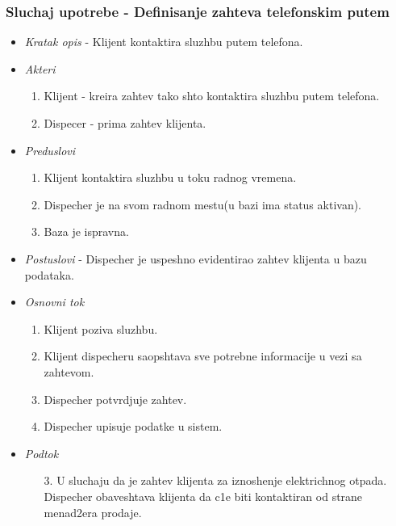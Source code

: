 \documentclass[10 pt]{article}
\begin{document}
	\subsubsection{Sluchaj upotrebe - Definisanje zahteva telefonskim putem}
	
		\begin{itemize}
			
			\item\textit{Kratak opis} - Klijent kontaktira sluzhbu putem telefona.

			
			\item\textit{Akteri} 
				\begin{enumerate}
					\item Klijent - kreira zahtev tako shto kontaktira sluzhbu putem telefona.
					\item Dispecer - prima zahtev klijenta.
				\end{enumerate}

			
			\item\textit{Preduslovi} 
				\begin{enumerate}
					\item Klijent kontaktira sluzhbu u toku  radnog vremena.
					\item Dispecher je na svom radnom mestu(u bazi ima status aktivan).

					\item Baza je ispravna.

				\end{enumerate}
			
			\item\textit{Postuslovi} - Dispecher je uspeshno evidentirao zahtev klijenta u bazu podataka.

			
			\item\textit{Osnovni tok}

				\begin{enumerate}
					\item Klijent poziva sluzhbu.

					\item Klijent dispecheru saopshtava sve potrebne informacije u vezi sa zahtevom.

					\item Dispecher potvrdjuje zahtev.

					\item Dispecher upisuje podatke u sistem.

				\end{enumerate}
			
			\item\textit{Podtok}
				\begin{enumerate}
					\item [3.] U sluchaju da je zahtev klijenta za iznoshenje elektrichnog otpada. Dispecher obaveshtava klijenta da c1e biti kontaktiran od strane menad2era prodaje.
				\end{enumerate}
			

\end{itemize}
\end{document}
